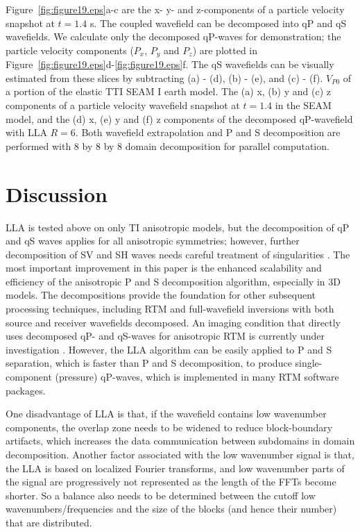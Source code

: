 \documentclass[manuscript,ulem,graphix,revised]{geophysics}
\begin{document}
Figure~\ref{fig:figure19.eps}a-c are  the x- y- and z-components of a particle velocity snapshot at $t=1.4$ s. The coupled wavefield can be decomposed into qP and qS wavefields. We calculate only the decomposed qP-waves for demonstration; the particle velocity components ($P_x$, $P_y$ and $P_z$) are plotted in Figure~\ref{fig:figure19.eps}d-\ref{fig:figure19.eps}f. The qS wavefields can be visually estimated from these slices by subtracting (a) - (d), (b) - (e), and (c) - (f).  
{
$V_{P0}$ of a portion of the elastic TTI SEAM I earth model.
}
{
The (a) x, (b) y and (c) z components of a particle velocity wavefield snapshot at $t=1.4$ in the SEAM model, and the (d) x, (e) y and (f) z components of the decomposed qP-wavefield with LLA $R=6$. Both wavefield extrapolation and P and S decomposition are performed with 8 by 8 by 8 domain decomposition for parallel computation.
}


\section{Discussion}
\indent\indent
LLA is tested above on only TI anisotropic models, but the decomposition of qP and qS waves applies for all anisotropic symmetries; however, further decomposition of SV and SH waves needs careful treatment of singularities \mbox{\citep{cheng16, Sripanich16}}. The most important improvement in this paper is the enhanced scalability and efficiency of the anisotropic P and S decomposition algorithm, especially in 3D models. The decompositions provide the foundation for other subsequent processing techniques, including RTM and full-wavefield inversions with both source and receiver wavefields decomposed. An imaging condition that directly uses decomposed qP- and qS-waves for anisotropic RTM is currently under investigation \citep[e.g.,][]{wang16}. However, the LLA algorithm can be easily applied to P and S separation, which is faster than P and S decomposition, to produce single-component (pressure) qP-waves, which is implemented in many RTM software packages.

One disadvantage of LLA is that, if the wavefield contains low wavenumber components, the overlap zone needs to be widened to reduce block-boundary artifacts, which increases the data communication between subdomains in domain decomposition. Another factor associated with the low wavenumber signal is that, the LLA is based on localized Fourier transforms, and low wavenumber parts of the signal are progressively not represented as the length of the FFTs become shorter. So a balance also needs to be determined between the cutoff low wavenumbers/frequencies and the size of the blocks (and hence their number) that are distributed. 
\end{document}

